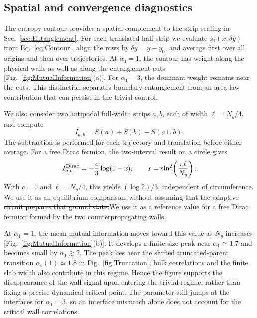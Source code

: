 \documentclass[aps,prb,10pt,twocolumn,superscriptaddress,longbibliography,floatfix]{revtex4-2}
\newcommand{\claudeadd}[1]{{\color{orange}#1}}
\newcommand{\claudedel}[1]{{\color{orange}\sout{#1}}}
\begin{document}
{\subsection{Spatial and convergence diagnostics}

The entropy contour provides a spatial complement to the strip scaling in Sec.~\ref{sec:Entanglement}. For each translated half-strip we evaluate $s_1(x,\delta y)$ from Eq.~\eqref{eq:Contour}, align the rows by $\delta y=y-y_0$, and average first over all origins and then over trajectories. At $\alpha_1=1$, the contour has weight along the physical walls as well as along the entanglement cuts [Fig.~\ref{fig:MutualInformation}(a)]. For $\alpha_1=3$, the dominant weight remains near the cuts. This distinction separates boundary entanglement from an area-law contribution that can persist in the trivial control.

We also consider two antipodal full-width strips $a,b$, each of width $\ell=N_y/4$, and compute
\begin{equation}
 I_{a,b}=S(a)+S(b)-S(a\cup b).
 \label{eq:MutualInformation}
\end{equation}
The subtraction is performed for each trajectory and translation before either average. For a free Dirac fermion, the two-interval result on a circle gives~\cite{CasiniHuerta2009,CalabreseCardyTonni2009}
\begin{equation}
 I^{\rm Dirac}_{a,b}=-\frac{c}{3}\log(1-x),\qquad
 x=\sin^2\!\left(\frac{\pi\ell}{N_y}\right).
 \label{eq:DiracMI}
\end{equation}
With $c=1$ and $\ell=N_y/4$, this yields $(\log2)/3$, independent of circumference. \claudedel{We use it as an equilibrium comparison, without assuming that the adaptive circuit prepares that ground state.}\claudeadd{We use it as a reference value for a free Dirac fermion formed by the two counterpropagating walls.}

At $\alpha_1=1$, the mean mutual information moves toward this value as $N_y$ increases [Fig.~\ref{fig:MutualInformation}(b)]. It develops a finite-size peak near $\alpha_1\simeq1.7$ and becomes small by $\alpha_1\gtrsim2$. The peak lies near the shifted truncated-parent transition $\alpha_c(1)\simeq1.8$ in Fig.~\ref{fig:Truncation}; bulk correlations and the finite slab width also contribute in this regime. Hence the figure supports the disappearance of the wall signal upon entering the trivial regime, rather than fixing a precise dynamical critical point. The parameter still jumps at the interfaces for $\alpha_1=3$, so an interface mismatch alone does not account for the critical wall correlations.
}
\end{document}
